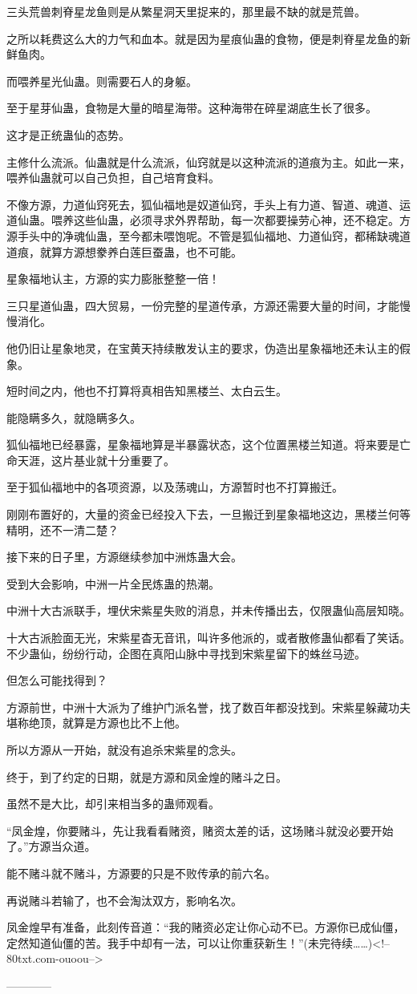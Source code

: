 \begin{this_body}
三头荒兽刺脊星龙鱼则是从繁星洞天里捉来的，那里最不缺的就是荒兽。

之所以耗费这么大的力气和血本。就是因为星痕仙蛊的食物，便是刺脊星龙鱼的新鲜鱼肉。

而喂养星光仙蛊。则需要石人的身躯。

至于星芽仙蛊，食物是大量的暗星海带。这种海带在碎星湖底生长了很多。

这才是正统蛊仙的态势。

主修什么流派。仙蛊就是什么流派，仙窍就是以这种流派的道痕为主。如此一来，喂养仙蛊就可以自己负担，自己培育食料。

不像方源，力道仙窍死去，狐仙福地是奴道仙窍，手头上有力道、智道、魂道、运道仙蛊。喂养这些仙蛊，必须寻求外界帮助，每一次都要操劳心神，还不稳定。方源手头中的净魂仙蛊，至今都未喂饱呢。不管是狐仙福地、力道仙窍，都稀缺魂道道痕，就算方源想豢养白莲巨蚕蛊，也不可能。

星象福地认主，方源的实力膨胀整整一倍！

三只星道仙蛊，四大贸易，一份完整的星道传承，方源还需要大量的时间，才能慢慢消化。

他仍旧让星象地灵，在宝黄天持续散发认主的要求，伪造出星象福地还未认主的假象。

短时间之内，他也不打算将真相告知黑楼兰、太白云生。

能隐瞒多久，就隐瞒多久。

狐仙福地已经暴露，星象福地算是半暴露状态，这个位置黑楼兰知道。将来要是亡命天涯，这片基业就十分重要了。

至于狐仙福地中的各项资源，以及荡魂山，方源暂时也不打算搬迁。

刚刚布置好的，大量的资金已经投入下去，一旦搬迁到星象福地这边，黑楼兰何等精明，还不一清二楚？

接下来的日子里，方源继续参加中洲炼蛊大会。

受到大会影响，中洲一片全民炼蛊的热潮。

中洲十大古派联手，埋伏宋紫星失败的消息，并未传播出去，仅限蛊仙高层知晓。

十大古派脸面无光，宋紫星杳无音讯，叫许多他派的，或者散修蛊仙都看了笑话。不少蛊仙，纷纷行动，企图在真阳山脉中寻找到宋紫星留下的蛛丝马迹。

但怎么可能找得到？

方源前世，中洲十大派为了维护门派名誉，找了数百年都没找到。宋紫星躲藏功夫堪称绝顶，就算是方源也比不上他。

所以方源从一开始，就没有追杀宋紫星的念头。

终于，到了约定的日期，就是方源和凤金煌的赌斗之日。

虽然不是大比，却引来相当多的蛊师观看。

“凤金煌，你要赌斗，先让我看看赌资，赌资太差的话，这场赌斗就没必要开始了。”方源当众道。

能不赌斗就不赌斗，方源要的只是不败传承的前六名。

再说赌斗若输了，也不会淘汰双方，影响名次。

凤金煌早有准备，此刻传音道：“我的赌资必定让你心动不已。方源你已成仙僵，定然知道仙僵的苦。我手中却有一法，可以让你重获新生！”(未完待续……)<!--80txt.com-ouoou-->

------------

\end{this_body}

